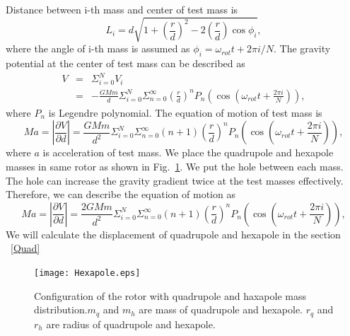 \documentclass[]{spie}  %
\begin{document}
Distance between i-th mass and center of test mass is 
\begin{equation}
L_i=d \sqrt{1+\left( \frac{r}{d} \right)^2 -2\left( \frac{r}{d} \right) \cos{\phi_i} },
\end{equation}
where the angle of i-th mass is assumed as $\phi_i=\omega_{rot} t + 2\pi i/N$.
The gravity potential at the center of test mass can be described as
\begin{eqnarray}
V &=& \Sigma^N_{i=0} V_i \\
&=&-\frac{GMm}{d} \Sigma^N_{i=0} \Sigma^{\infty}_{n=0} \left( \frac{r}{d} \right)^n P_n\left(\cos{\left(\omega_{rot} t +\frac{2 \pi i}{N}\right)}\right),
\end{eqnarray}
where $P_n$ is Legendre polynomial. The equation of motion of test mass is 
\begin{equation}
Ma=\left| \frac{\partial V}{\partial{d}} \right| =\frac{GMm}{d^2}\Sigma^N_{i=0} \Sigma^{\infty}_{n=0}(n+1) \left( \frac{r}{d} \right)^n P_n\left(\cos{\left(\omega_{rot} t +\frac{2 \pi i}{N}\right)}\right),
\end{equation}
where $a$ is acceleration of test mass. We place the quadrupole and hexapole masses in same rotor as shown in Fig.~\ref{fig:hex}. We put the hole between each mass. The hole can increase the gravity gradient twice at the test masses effectively. Therefore, we can describe the equation of motion as 
\begin{equation}
Ma=\left| \frac{\partial V}{\partial{d}} \right| =\frac{2GMm}{d^2}\Sigma^N_{i=0} \Sigma^{\infty}_{n=0}(n+1) \left( \frac{r}{d} \right)^n P_n\left(\cos{\left(\omega_{rot} t +\frac{2 \pi i}{N}\right)}\right),
\end{equation}
We will calculate the displacement of quadrupole and hexapole in the section ~\ref{Quad} 

\begin{figure}
\begin{center}
\texttt{[image: Hexapole.eps]}
\caption{Configuration of the rotor with quadrupole and haxapole mass distribution.$m_q$ and $m_h$ are mass of quadrupole and hexapole. $r_q$ and $r_h$ are radius of quadrupole and hexapole.}
\label{fig:hex}
\end{center}
\end{figure}
\end{document}
